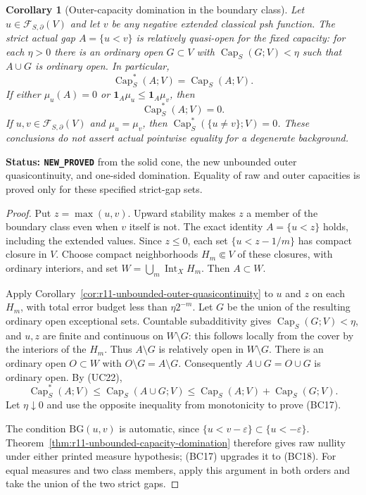 \documentclass[11pt,a4paper]{article}
\numberwithin{equation}{section}
\newtheorem{corollary}[theorem]{Corollary}
\theoremstyle{definition}
\theoremstyle{remark}
\begin{document}
\begin{corollary}[Outer-capacity domination in the boundary class]
\label{cor:r11-boundary-outer-domination}
Let $u\in\mathcal F_{S,\partial}(V)$ and let $v$ be any
negative extended classical psh function. The strict actual gap
$A=\{u<v\}$ is relatively quasi-open for the fixed capacity:
for each $\eta>0$ there is an ordinary open $G\subset V$ with
$\operatorname{Cap}_S(G;V)<\eta$ such that $A\cup G$ is
ordinary open. In particular,
\[
                 \operatorname{Cap}_S^*(A;V)
                              =\operatorname{Cap}_S(A;V).
 \tag{BC17}
\]
If either $\mu_u(A)=0$ or
$\mathbf1_A\mu_u\leq\mathbf1_A\mu_v$, then
\[
                        \operatorname{Cap}_S^*(A;V)=0.
 \tag{BC18}
\]
If $u,v\in\mathcal F_{S,\partial}(V)$ and $\mu_u=\mu_v$,
then $\operatorname{Cap}_S^*(\{u\ne v\};V)=0$.
These conclusions do not assert actual pointwise equality for a
degenerate background.
\end{corollary}

\noindent\textbf{Status: \texttt{NEW\_PROVED}} from the solid
cone, the new unbounded outer quasicontinuity, and one-sided
domination. Equality of raw and outer capacities is proved only
for these specified strict-gap sets.

\begin{proof}
Put $z=\max(u,v)$. Upward stability makes $z$ a member of the
boundary class even when $v$ itself is not. The exact identity
$A=\{u<z\}$ holds, including the extended values. Since $z\leq0$,
each set $\{u<z-1/m\}$ has compact closure in $V$.
Choose compact neighborhoods $H_m\Subset V$ of these closures,
with ordinary interiors, and set $W=\bigcup_m\operatorname{Int}_X H_m$.
Then $A\subset W$.

Apply Corollary~\ref{cor:r11-unbounded-outer-quasicontinuity} to
$u$ and $z$ on each $H_m$, with total error budget less than
$\eta2^{-m}$. Let $G$ be the union of the resulting ordinary
open exceptional sets. Countable subadditivity gives
$\operatorname{Cap}_S(G;V)<\eta$, and $u,z$ are finite and
continuous on $W\setminus G$: this follows locally from the
cover by the interiors of the $H_m$. Thus $A\setminus G$ is
relatively open in $W\setminus G$. There is an ordinary open
$O\subset W$ with $O\setminus G=A\setminus G$.
Consequently $A\cup G=O\cup G$ is ordinary open. By (UC22),
\[
 \operatorname{Cap}_S^*(A;V)
 \leq\operatorname{Cap}_S(A\cup G;V)
 \leq\operatorname{Cap}_S(A;V)+\operatorname{Cap}_S(G;V).
\]
Let $\eta\downarrow0$ and use the opposite inequality from
monotonicity to prove (BC17).

The condition $\mathrm{BG}(u,v)$ is automatic, since
$\{u<v-\varepsilon\}\subset\{u<-\varepsilon\}$.
Theorem~\ref{thm:r11-unbounded-capacity-domination} therefore
gives raw nullity under either printed measure hypothesis;
(BC17) upgrades it to (BC18). For equal measures and two class
members, apply this argument in both orders and take the union
of the two strict gaps.
\end{proof}
\end{document}
